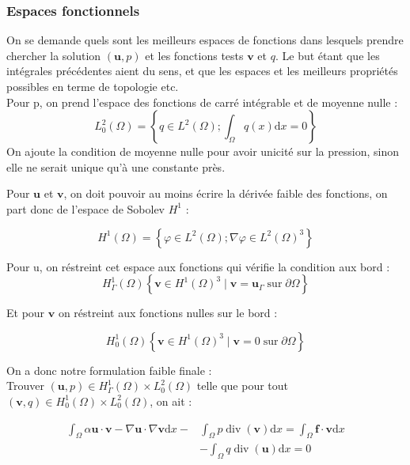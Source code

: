  \subsubsection{Espaces fonctionnels}
On se demande quels sont les meilleurs espaces de fonctions dans lesquels prendre chercher la solution $(\mathbf{u}, p)$ et les fonctions tests $\mathbf{v}$ et $q$. Le but étant que les intégrales précédentes aient du sens, et que les espaces et les meilleurs propriétés possibles en terme de topologie etc.\\

Pour p, on prend l'espace des fonctions de carré intégrable et de moyenne nulle : 
\[
L_{0}^{2}(\Omega)=\left\{q \in L^{2}(\Omega) ; \int_{\Omega} q(x) \mathrm{d} x=0\right\}
\]
On ajoute la condition de moyenne nulle pour avoir unicité sur la pression, sinon elle ne serait unique qu'à une constante près.

Pour $\mathbf{u}$ et $\mathbf{v}$, on doit pouvoir au moins écrire la dérivée faible des fonctions, on part donc de l'espace de Sobolev $H^1$ : 

\begin{equation}
H^{1}(\Omega)=\left\{\varphi \in L^{2}(\Omega) ; \nabla \varphi \in L^{2}(\Omega)^{3}\right\}
\end{equation}

Pour u, on réstreint cet espace aux fonctions qui vérifie la condition aux bord :
\[H^{1}_{\Gamma}(\Omega)
\left\{\mathbf{v} \in H^{1}(\Omega)^{3} \mid \mathbf{v}=\mathbf{u}_{\Gamma} \operatorname{sur}\partial \Omega\right \}
\]
 
Et pour $\mathbf{v}$ on réstreint aux fonctions nulles sur le bord : 

\[H^{1}_{0}(\Omega)
\left\{\mathbf{v} \in H^{1}(\Omega)^{3} \mid \mathbf{v}=0 \operatorname{sur}\partial \Omega\right \}
\]

On a donc notre formulation faible finale : \\
Trouver $(\mathbf{u}, p) \in H^{1}_{\Gamma}(\Omega) \times L_{0}^{2}(\Omega)$ telle que pour tout 
$(\mathbf{v}, q) \in H^{1}_{0}(\Omega) \times L_{0}^{2}(\Omega)$, on ait : 

\begin{equation}
\begin{aligned}
\int_{\Omega}\alpha \mathbf{u} \cdot \mathbf{v}-\nabla \mathbf{u} \cdot \nabla \mathbf{v} \mathrm{d} x-& \int_{\Omega} p \operatorname{div}( \mathbf{v}) \mathrm{d} x=\int_{\Omega} \mathbf{f} \cdot \mathbf{v} \mathrm{d} x\\
&-\int_{\Omega} q \operatorname{div}( \mathbf{u}) \mathrm{d} x=0
\end{aligned}
\end{equation}


